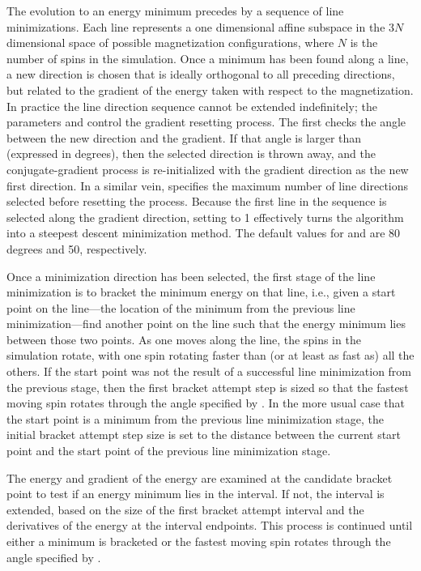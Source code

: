 \begin{description}
The evolution to an energy minimum precedes by a sequence of line
minimizations.  Each line represents a one dimensional affine subspace
in the $3N$ dimensional space of possible magnetization configurations,
where $N$ is the number of spins in the simulation.  Once a minimum has
been found along a line, a new direction is chosen that is ideally
orthogonal to all preceding directions, but related to the gradient of
the energy taken with respect to the magnetization.  In practice the
line direction sequence cannot be extended indefinitely; the parameters
 and 
control the gradient resetting process.  The first checks the angle
between the new direction and the gradient.  If that angle is larger
than  (expressed in degrees), then the selected
direction is thrown away, and the conjugate-gradient process is
re-initialized with the gradient direction as the new first direction.
In a similar vein,  specifies the maximum number of line
directions selected before resetting the process.  Because the first
line in the sequence is selected along the gradient direction, setting
 to 1 effectively turns the algorithm into a steepest
descent minimization method.  The default values for
 and  are 80 degrees and 50,
respectively.

Once a minimization direction has been selected, the first stage of the
line minimization is to bracket the minimum energy on that line, i.e.,
given a start point on the line---the location of the minimum from the
previous line minimization---find another point on the line such that
the energy minimum lies between those two points.  As one moves along
the line, the spins in the simulation rotate, with one spin rotating
faster than (or at least as fast as) all the others.  If the start point
was not the result of a successful line minimization from the previous
stage, then the first bracket attempt step is sized so that the fastest
moving spin rotates through the angle specified by
.  In the more usual case that the
start point is a minimum from the previous line minimization stage, the
initial bracket attempt step size is set to the distance between the
current start point and the start point of the previous line
minimization stage.

The energy and gradient of the energy are examined at the candidate
bracket point to test if an energy minimum lies in the interval.  If
not, the interval is extended, based on the size of the first bracket
attempt interval and the derivatives of the energy at the interval
endpoints.  This process is continued until either a minimum is
bracketed or the fastest moving spin rotates through the angle specified
by .


\end{description}
